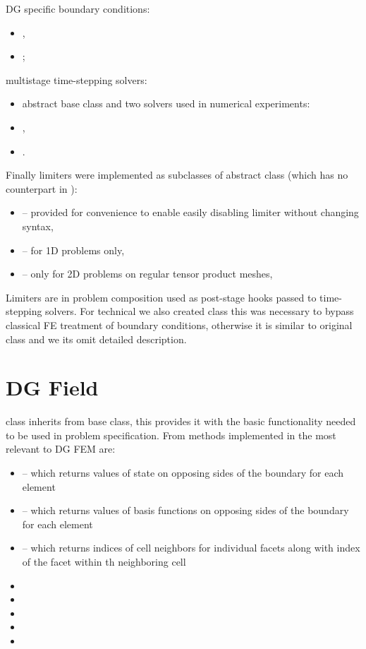 DG specific boundary conditions:
\begin{itemize}
    \item {},
    \item {};
\end{itemize}
multistage time-stepping solvers: 
\begin{itemize}
    \item abstract base class  and two solvers used in numerical experiments:
    \item {},
    \item {}.
\end{itemize}
Finally limiters were implemented as subclasses of  abstract class (which has no 
counterpart in \sfepy{}):
\begin{itemize}
    \item {} -- provided for convenience to enable 
    easily disabling limiter without changing 
    syntax,
    \item {} -- for 1D problems only,
    \item {} -- only for 2D problems on regular tensor 
    product 
    meshes,
\end{itemize} 
Limiters are in problem composition used as post-stage hooks passed to time-stepping solvers. For 
technical we also created  class this was necessary to bypass classical FE 
treatment of boundary conditions, otherwise it is similar to original \sfepy{}  
class and we its omit detailed description.


\section{DG Field}
 class inherits from  base class, this provides it with the basic 
functionality needed to be used in problem specification. From methods implemented in 
 the most relevant to DG FEM are:
\begin{itemize}
    \item {} -- which returns values of state on opposing sides of 
    the boundary for each element
    \item {} -- which returns values of basis functions on opposing 
    sides of the boundary for each element
    \item {} -- which returns indices of cell neighbors for individual 
    facets along with index of the facet within th neighboring cell 
    \item {}
    \item {}
    \item {}
    \item {}
    \item {}
\end{itemize}

